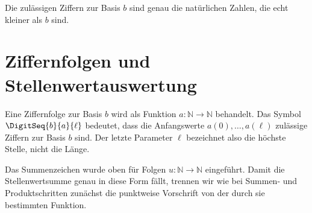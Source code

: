 \documentclass[main.tex]{subfiles}
\begin{document}
Die zulässigen Ziffern zur Basis \(b\) sind genau die natürlichen Zahlen, die
echt kleiner als \(b\) sind.


\section{Ziffernfolgen und Stellenwertauswertung}

Eine Ziffernfolge zur Basis \(b\) wird als Funktion
\(a\colon\mathbb{N}\to\mathbb{N}\) behandelt. Das Symbol
\(\DigitSeq{b}{a}{\ell}\) bedeutet, dass die Anfangswerte
\(a(0),\ldots,a(\ell)\) zulässige Ziffern zur Basis \(b\) sind. Der letzte
Parameter \(\ell\) bezeichnet also die höchste Stelle, nicht die Länge.


Das Summenzeichen wurde oben für Folgen \(u\colon\mathbb{N}\to\mathbb{N}\)
eingeführt. Damit die Stellenwertsumme genau in diese Form fällt, trennen wir
wie bei Summen- und Produktschritten zunächst die punktweise Vorschrift von
der durch sie bestimmten Funktion.

\end{document}
